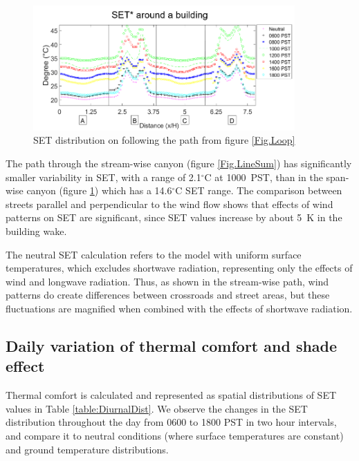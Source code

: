 \documentclass[preprint,3p,12pt,english]{elsarticle}
\begin{document}
\begin{figure}[H]
\graphicspath{ {image/} }
\centerline{\includegraphics[width=10cm]{loop_sum_final.png}}
\caption{SET distribution on following the path from figure  \ref{Fig.Loop}}
\label{Fig.LoopSum}
\end{figure}


The path through the stream-wise canyon (figure \ref{Fig.LineSum}) has significantly smaller variability in SET, with a range of 2.1$^{\circ}$C at 1000~PST, than in the span-wise canyon (figure \ref{Fig.LoopSum}) which has a 14.6$^{\circ}$C SET range. The comparison between streets parallel and perpendicular to the wind flow shows that effects of wind patterns on SET are significant, since SET values increase by about 5~K in the building wake. 

The neutral SET calculation refers to the model with uniform surface temperatures, which excludes shortwave radiation, representing only the effects of wind and longwave radiation. Thus, as shown in the stream-wise path, wind patterns do create differences between crossroads and street areas, but these fluctuations are magnified when combined with the effects of shortwave radiation. 




\subsection{Daily variation of thermal comfort and shade effect}

Thermal comfort is calculated and represented as spatial distributions of SET values in Table \ref{table:DiurnalDist}. We observe the changes in the SET distribution throughout the day from 0600 to 1800 PST in two hour intervals, and compare it to neutral conditions (where surface temperatures are constant) and ground temperature distributions. 
\end{document}
